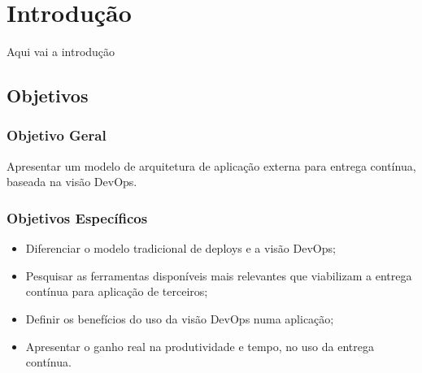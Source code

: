 
\chapter{Introdução}\label{intro}

Aqui vai a introdução



\section{Objetivos}
\subsection{Objetivo Geral }
Apresentar um modelo de arquitetura de aplicação externa para entrega contínua, baseada na visão DevOps.



\begin{comment}
Este é um comentário
\end{comment}

\subsection{Objetivos Específicos}
\begin{itemize}
\item Diferenciar o modelo tradicional de deploys e a visão DevOps;

\item Pesquisar as ferramentas disponíveis mais relevantes que viabilizam a entrega contínua para aplicação de terceiros;

\item Definir os benefícios do uso da visão DevOps numa aplicação;

\item Apresentar o ganho real na produtividade e tempo, no uso da entrega contínua.

\end{itemize}
